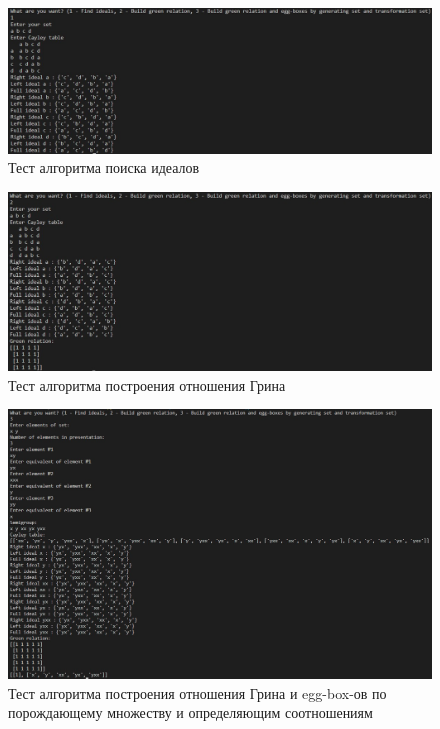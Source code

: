 \documentclass[spec, och, labwork]{shiza}
\begin{document}
      \begin{figure}[H]
        \centering      %
        \includegraphics[width=1.\textwidth]{pic/1}
        \caption{Тест алгоритма поиска идеалов}
        \label{fig:image1}
    \end{figure}

    \begin{figure}[H]
        \centering      %
        \includegraphics[width=1.\textwidth]{pic/2}
        \caption{Тест алгоритма построения отношения Грина}
        \label{fig:image1}
    \end{figure}

    \begin{figure}[H]
        \centering      %
        \includegraphics[width=1.\textwidth]{pic/3}
        \caption{Тест алгоритма построения отношения Грина и egg-box-ов по порождающему
        множеству и определяющим соотношениям}
        \label{fig:image1}
    \end{figure}
\end{document}
